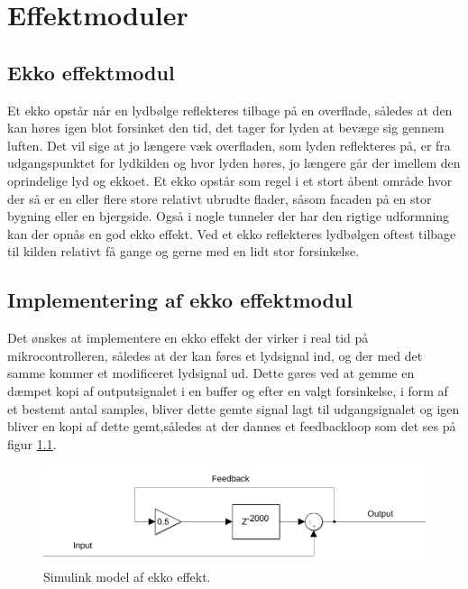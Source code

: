 \chapter{Effektmoduler}\label{chap:DSP}

\section{Ekko effektmodul}\label{sec:echo}
Et ekko opstår når en lydbølge reflekteres tilbage på en overflade, således at den kan høres igen blot forsinket den tid, det tager for lyden at bevæge sig gennem luften.
Det vil sige at jo længere væk overfladen, som lyden reflekteres på, er fra udgangspunktet for lydkilden og hvor lyden høres, jo længere går der imellem den oprindelige lyd og ekkoet.
Et ekko opstår som regel i et stort åbent område hvor der så er en eller flere store relativt ubrudte flader, såsom facaden på en stor bygning eller en bjergside.
Også i nogle tunneler der har den rigtige udformning kan der opnås en god ekko effekt.
Ved et ekko reflekteres lydbølgen oftest tilbage til kilden relativt få gange og gerne med en lidt stor forsinkelse.

\section{Implementering af ekko effektmodul}
Det ønskes at implementere en ekko effekt der virker i real tid på mikrocontrolleren, således at der kan føres et lydsignal ind, og der med det samme kommer et modificeret lydsignal ud.
Dette gøres ved at gemme en dæmpet kopi af outputsignalet i en buffer og efter en valgt forsinkelse, i form af et bestemt antal samples, bliver dette gemte signal lagt til udgangsignalet og igen bliver en kopi af dette gemt,således at der dannes et feedbackloop som det ses på figur \ref{fig:echo_simulink}.

\begin{figure}[h]
	\includegraphics[width=0.8\linewidth]{./billeder/Echo_simulink.png}
	\caption{Simulink model af ekko effekt.}
	\label{fig:echo_simulink}
\end{figure}

